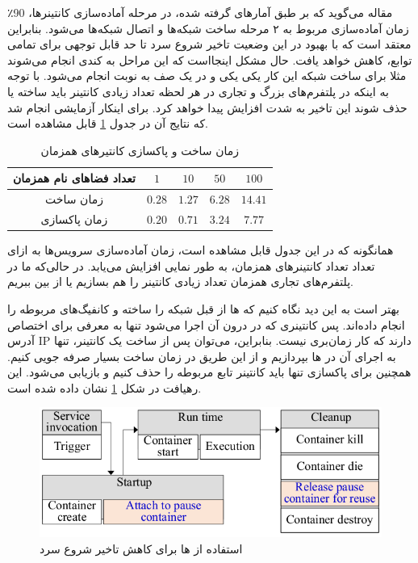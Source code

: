 مقاله می‌گوید که بر طبق آمارهای گرفته شده، در مرحله آماده‌سازی کانتینرها، 90٪ زمان آماده‌سازی مربوط به ۲ مرحله ساخت شبکه‌ها و اتصال شبکه‌ها می‌شود. بنابراین معتقد است که با بهبود در این وضعیت تاخیر شروع سرد تا حد قابل توجهی برای تمامی توابع، کاهش خواهد یافت. حال مشکل اینجا‌است که این مراحل به کندی انجام می‌شوند مثلا برای ساخت شبکه این کار یکی یکی و در یک صف به نوبت انجام می‌شود. با توجه به اینکه در پلتفرم‌های بزرگ و تجاری در هر لحظه تعداد زیادی کانتینر باید ساخته یا حذف شوند این تاخیر به شدت افزایش پیدا خواهد کرد. برای اینکار آزمایشی انجام شد که نتایج آن در جدول \ref{table:1} قابل مشاهده است. 
\par

\begin{table}[h]
	\begin{center}
		\caption{زمان ساخت و پاکسازی کانتیرهای همزمان}
		\begin{tabular} {| c | c | c | c | c |}
			\hline
			
			تعداد فضا‌های نام همزمان & $1$ & $10$ & $50$ & $100$ \\
			\hline
			زمان ساخت & $0.28$ & $1.27$ & $6.28$ & $14.41$ \\
			\hline
			زمان پاکسازی & $0.20$ & $0.71$ & $3.24$ & $7.77$ \\
			\hline
		\end{tabular}
	\label{table:1}
	\end{center}
\end{table}

همانگونه که در این جدول قابل مشاهده است، زمان آماده‌سازی سرویس‌ها به ازای تعداد تعداد کانتینرهای همزمان، به طور نمایی افزایش می‌یابد. در حالی‌که ما در پلتفرم‌های تجاری همزمان تعداد زیادی کانتینر را هم بسازیم یا از بین ببریم. 

بهتر است به این دید نگاه کنیم که  ها از قبل شبکه را ساخته و کانفیگ‌های مربوطه را انجام داده‌اند. پس کانتینری که در درون آن اجرا می‌شود تنها به معرفی برای اختصاص آدرس IP دارند که کار زمان‌بری نیست. بنابراین، می‌توان پس از ساخت یک کانتینر، تنها به اجرای آن در  ها بپردازیم و از این طریق در زمان ساخت بسیار صرفه جویی کنیم. همچنین برای پاکسازی تنها باید کانتینر تابع مربوطه را حذف کنیم و  بازیابی می‌شود. این رهیافت در شکل \ref{fig:pause-container-solution} نشان داده شده است.

\begin{figure}
	\centering
	\includegraphics[width=0.8\linewidth]{figs/pause-container-solution}
	\caption {استفاده از ها برای کاهش تاخیر شروع سرد}
	\label{fig:pause-container-solution}
\end{figure}


